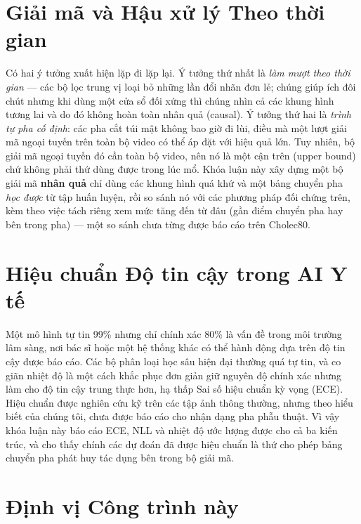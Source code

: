 \documentclass[11pt,a4paper]{report}
\begin{document}
\section{Giải mã và Hậu xử lý Theo thời gian}

Có hai ý tưởng xuất hiện lặp đi lặp lại. Ý tưởng thứ nhất là \emph{làm mượt theo thời gian} --- các bộ lọc trung vị loại bỏ những lần đổi nhãn đơn lẻ; chúng giúp ích đôi chút nhưng khi dùng một cửa sổ đối xứng thì chúng nhìn cả các khung hình tương lai và do đó không hoàn toàn nhân quả (causal). Ý tưởng thứ hai là \emph{trình tự pha cố định}: các pha cắt túi mật không bao giờ đi lùi, điều mà một lượt giải mã ngoại tuyến trên toàn bộ video có thể áp đặt với hiệu quả lớn. Tuy nhiên, bộ giải mã ngoại tuyến đó cần toàn bộ video, nên nó là một cận trên (upper bound) chứ không phải thứ dùng được trong lúc mổ. Khóa luận này xây dựng một bộ giải mã \textbf{nhân quả} chỉ dùng các khung hình quá khứ và một bảng chuyển pha \emph{học được} từ tập huấn luyện, rồi so sánh nó với các phương pháp đối chứng trên, kèm theo việc tách riêng xem mức tăng đến từ đâu (gần điểm chuyển pha hay bên trong pha) --- một so sánh chưa từng được báo cáo trên Cholec80.

\section{Hiệu chuẩn Độ tin cậy trong AI Y tế}

Một mô hình tự tin 99\% nhưng chỉ chính xác 80\% là vấn đề trong môi trường lâm sàng, nơi bác sĩ hoặc một hệ thống khác có thể hành động dựa trên độ tin cậy được báo cáo. Các bộ phân loại học sâu hiện đại thường quá tự tin, và co giãn nhiệt độ là một cách khắc phục đơn giản giữ nguyên độ chính xác nhưng làm cho độ tin cậy trung thực hơn, hạ thấp Sai số hiệu chuẩn kỳ vọng (ECE). Hiệu chuẩn được nghiên cứu kỹ trên các tập ảnh thông thường, nhưng theo hiểu biết của chúng tôi, chưa được báo cáo cho nhận dạng pha phẫu thuật. Vì vậy khóa luận này báo cáo ECE, NLL và nhiệt độ ước lượng được cho cả ba kiến trúc, và cho thấy chính các dự đoán đã được hiệu chuẩn là thứ cho phép bảng chuyển pha phát huy tác dụng bên trong bộ giải mã.

\section{Định vị Công trình này}
\end{document}
